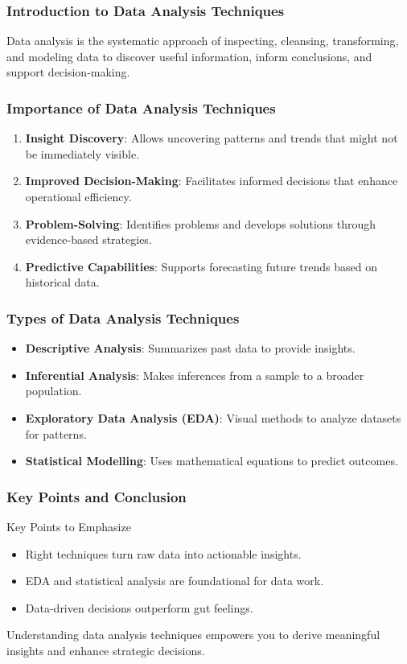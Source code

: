 \documentclass[aspectratio=169]{beamer}
\begin{document}
\frame{\titlepage}

\begin{frame}[fragile]
    \frametitle{Introduction to Data Analysis Techniques}
    Data analysis is the systematic approach of inspecting, cleansing, transforming, and modeling data to discover useful information, inform conclusions, and support decision-making. 
\end{frame}

\begin{frame}[fragile]
    \frametitle{Importance of Data Analysis Techniques}
    \begin{enumerate}
        \item \textbf{Insight Discovery}: Allows uncovering patterns and trends that might not be immediately visible.
        \item \textbf{Improved Decision-Making}: Facilitates informed decisions that enhance operational efficiency.
        \item \textbf{Problem-Solving}: Identifies problems and develops solutions through evidence-based strategies.
        \item \textbf{Predictive Capabilities}: Supports forecasting future trends based on historical data.
    \end{enumerate}
\end{frame}

\begin{frame}[fragile]
    \frametitle{Types of Data Analysis Techniques}
    \begin{itemize}
        \item \textbf{Descriptive Analysis}: Summarizes past data to provide insights.
        \item \textbf{Inferential Analysis}: Makes inferences from a sample to a broader population.
        \item \textbf{Exploratory Data Analysis (EDA)}: Visual methods to analyze datasets for patterns.
        \item \textbf{Statistical Modelling}: Uses mathematical equations to predict outcomes.
    \end{itemize}
\end{frame}

\begin{frame}[fragile]
    \frametitle{Key Points and Conclusion}
    \begin{block}{Key Points to Emphasize}
        \begin{itemize}
            \item Right techniques turn raw data into actionable insights.
            \item EDA and statistical analysis are foundational for data work.
            \item Data-driven decisions outperform gut feelings.
        \end{itemize}
    \end{block}
    \newline
    Understanding data analysis techniques empowers you to derive meaningful insights and enhance strategic decisions.
\end{frame}
\end{document}
